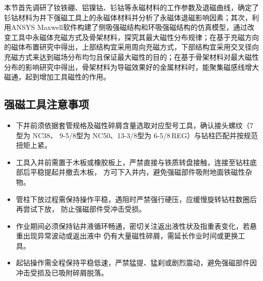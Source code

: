 本节首先调研了钕铁硼、铝镍钴、钐钴等永磁材料的工作参数及退磁曲线，确定了钐钴材料为井下强磁工具上的永磁体材料并分析了永磁体退磁影响因素；其次，利用ANSYS Maxwell软件构建了侧吸强磁结构和环吸强磁结构的仿真模型，通过改变工具中永磁体充磁方式及骨架材料，探究其最大磁性分布规律；在基于充磁方向的磁体布置研究中得出，上部结构宜采用周向充磁方式，下部结构宜采用交叉径向充磁方式来达到磁场分布均匀且保证最大磁性的目的；在基于骨架材料对最大磁性分布的影响研究中得出，骨架材料为导磁效果好的金属材料时，能聚集磁感线增大磁通，起到增加工具磁性的作用。






























































\subsection{强磁工具注意事项}

\begin{itemize}
	\item 下井前须依据套管规格及磁性碎屑含量选取对应型号工具，确认接头螺纹（7\inch 型为 NC38、
	9-5/8\inch 型为 NC50、13-3/8\inch 型为 6-5/8\,REG）与钻柱匹配并按规范扭矩上紧。
	\item 工具入井前需置于木板或橡胶板上，严禁直接与铁质转盘接触，连接至钻柱底部后平稳提起并撤去木板，
	方可下入井内，避免强磁部件吸附地面铁磁性杂物。
	\item 管柱下放过程需保持操作平稳，遇阻时严禁强行硬压，应缓慢旋转钻柱数圈后再尝试下放，
	防止强磁部件受冲击受损。
	\item 作业期间必须保持钻井液循环畅通，密切关注返出液性状及指重表变化，若悬重出现异常波动或返出液中
	仍有大量磁性碎屑，需延长作业时间或更换工具。
	\item 起钻操作需全程保持平稳低速，严禁猛提、猛刹或剧烈震动，避免强磁部件因冲击受损及已吸附碎屑脱落。
\end{itemize}

